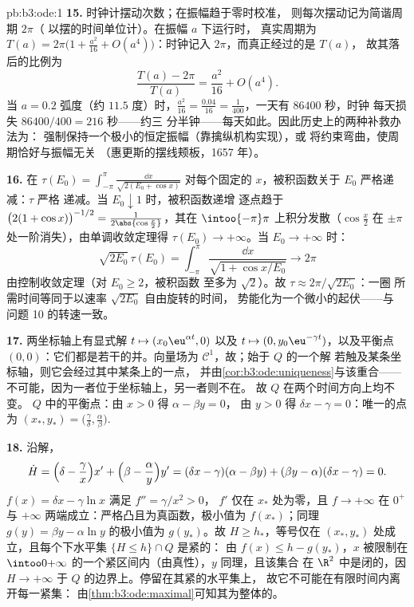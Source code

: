 \begin{solution}{pb:b3:ode:1}
\textbf{15.} 时钟计摆动次数；在振幅趋于零时校准，
则每次摆动记为简谐周期 $2\pi$（
以摆的时间单位计）。在振幅 $a$ 下运行时，
真实周期为 $T(a) = 2\pi\bigl(1 + \frac{a^2}{16} +
O(a^4)\bigr)$：时钟记入 $2\pi$，而真正经过的是 $T(a)$，
故其落后的比例为
\[
\frac{T(a) - 2\pi}{T(a)} = \frac{a^2}{16} + O(a^4) .
\]
当 $a = 0.2$ 弧度（约 $11.5$ 度）时，$\frac{a^2}{16} =
\frac{0.04}{16} = \frac1{400}$，一天有 $86400$ 秒，时钟
每天损失 $86400/400 = 216$ 秒——约三
分半钟——每天如此。因此历史上的两种补救办法为：
强制保持一个极小的恒定振幅（靠擒纵机构实现），或
将约束弯曲，使周期恰好与振幅无关
（惠更斯的摆线颊板，1657 年）。

\textbf{16.} 在 $\tau(E_0) = \int_{-\pi}^{\pi}\frac{\dd
x}{\sqrt{2(E_0 + \cos x)}}$ 对每个固定的
$x$，被积函数关于 $E_0$ 严格递减：$\tau$ 严格
递减。当 $E_0 \downarrow 1$ 时，被积函数递增
逐点趋于 $\bigl(2(1 + \cos x)\bigr)^{-1/2} =
\frac1{2\abs{\cos\frac x2}}$，其在
$\intoo{-\pi}\pi$ 上积分发散（$\cos\frac x2$ 在
$\pm\pi$ 处一阶消失），由单调收敛定理得 $\tau(E_0)
\to +\infty$。当 $E_0 \to +\infty$ 时：
\[
\sqrt{2E_0}\,\tau(E_0) = \int_{-\pi}^{\pi}
\frac{\dd x}{\sqrt{1 + \cos x/E_0}} \longrightarrow 2\pi
\]
由控制收敛定理（对 $E_0 \geq 2$，被积函数
至多为 $\sqrt2$）。故 $\tau \approx 2\pi/\sqrt{2E_0}$：一圈
所需时间等同于以速率 $\sqrt{2E_0}$ 自由旋转的时间，
势能化为一个微小的起伏——与
问题 10 的转速一致。

\textbf{17.} 两坐标轴上有显式解 $t
\mapsto (x_0\eu^{\alpha t}, 0)$ 以及 $t \mapsto (0,
y_0\eu^{-\gamma t})$，以及平衡点
$(0, 0)$：它们都是若干的并。向量场为 $\mathcal
C^1$，故；始于 $Q$ 的一个解
若触及某条坐标轴，则它会经过其中某条上的一点，
并由\cref{cor:b3:ode:uniqueness}与该重合——
不可能，因为一者位于坐标轴上，另一者则不在。
故 $Q$ 在两个时间方向上均不变。
$Q$ 中的平衡点：由 $x > 0$ 得 $\alpha - \beta y = 0$，
由 $y > 0$ 得 $\delta x - \gamma = 0$：唯一的点为
$(x_*, y_*) = \bigl(\frac\gamma\delta,
\frac\alpha\beta\bigr)$.

\textbf{18.} 沿解，
\[
\dot H = \Bigl(\delta - \frac\gamma x\Bigr)x' +
\Bigl(\beta - \frac\alpha y\Bigr)y'
= (\delta x - \gamma)(\alpha - \beta y) +
(\beta y - \alpha)(\delta x - \gamma) = 0 .
\]
$f(x) = \delta x - \gamma\ln x$ 满足 $f'' = \gamma/x^2 > 0$，
$f'$ 仅在 $x_*$ 处为零，且 $f \to +\infty$ 在
$0^+$ 与 $+\infty$ 两端成立：严格凸且为真函数，极小值为
$f(x_*)$；同理 $g(y) = \beta y - \alpha\ln y$ 的极小值为
$g(y_*)$。故 $H \geq h_*$，等号仅在 $(x_*,
y_*)$ 处成立，且每个下水平集 $\{H \leq h\}\cap Q$ 是紧的：
由 $f(x) \leq h - g(y_*)$，$x$ 被限制在
$\intoo0{+\infty}$ 的一个紧区间内（由真性），$y$ 同理，且该集合
在 $\R^2$ 中是闭的，因 $H \to +\infty$ 于
$Q$ 的边界上。停留在其紧的水平集上，
故它不可能在有限时间内离开每一紧集：
由\cref{thm:b3:ode:maximal}可知其为整体的。


\end{solution}
